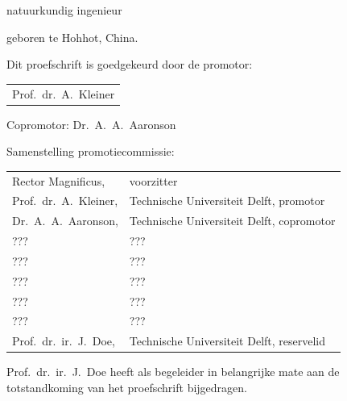 \begin{titlepage}
\begin{center}
\bigskip
\bigskip

natuurkundig ingenieur

geboren te Hohhot, China.

\vspace*{2\bigskipamount}

\end{center}

\clearpage
\thispagestyle{empty}

\noindent Dit proefschrift is goedgekeurd door de promotor:

\medskip\noindent
\begin{tabular}{l}
    Prof.\ dr.\ A.\ Kleiner
\end{tabular}

\medskip
\noindent Copromotor: Dr.\ A.\ A.\ Aaronson

\medskip
\noindent Samenstelling promotiecommissie:

\medskip\noindent
\begin{tabular}{ll}
    Rector Magnificus, & voorzitter \\
    Prof.\ dr.\ A.\ Kleiner, & Technische Universiteit Delft, promotor \\
    Dr.\ A.\ A.\ Aaronson, & Technische Universiteit Delft, copromotor \\
    ??? & ??? \\
    ??? & ??? \\
    ??? & ??? \\
    ??? & ??? \\
    ??? & ??? \\
    Prof.\ dr.\ ir.\ J.\ Doe, & Technische Universiteit Delft, reservelid
\end{tabular}

\medskip
\noindent Prof.\ dr.\ ir.\ J.\ Doe heeft als begeleider in belangrijke mate aan de totstandkoming van het proefschrift bijgedragen.


\end{titlepage}

